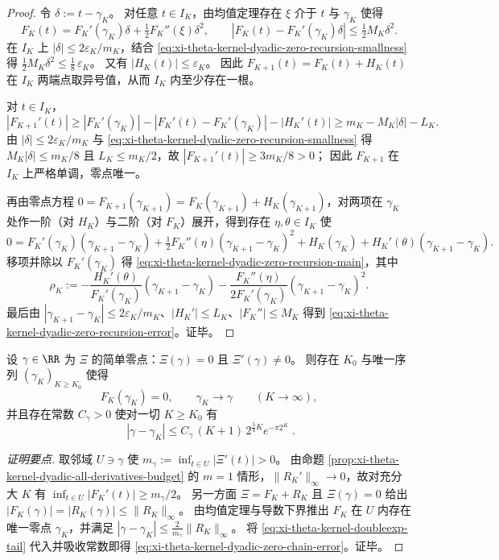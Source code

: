 \begin{proof}
令 \(\delta:=t-\gamma_K\)。
对任意 \(t\in I_K\)，由均值定理存在 \(\xi\) 介于 \(t\) 与 \(\gamma_K\) 使得
\[
F_K(t)=F_K'(\gamma_K)\delta+\tfrac12 F_K''(\xi)\delta^2,
\qquad
|F_K(t)-F_K'(\gamma_K)\delta|\le \tfrac12 M_K\delta^2.
\]
在 \(I_K\) 上 \(|\delta|\le 2\varepsilon_K/m_K\)，结合 \eqref{eq:xi-theta-kernel-dyadic-zero-recursion-smallness} 得
\(
\tfrac12 M_K\delta^2\le \tfrac18\,\varepsilon_K
\)。
又有 \(|H_K(t)|\le \varepsilon_K\)。
因此 \(F_{K+1}(t)=F_K(t)+H_K(t)\) 在 \(I_K\) 两端点取异号值，从而 \(I_K\) 内至少存在一根。
\par
对 \(t\in I_K\)，
\[
|F_{K+1}'(t)|
\ge |F_K'(\gamma_K)|-|F_K'(t)-F_K'(\gamma_K)|-|H_K'(t)|
\ge m_K-M_K|\delta|-L_K.
\]
由 \(|\delta|\le 2\varepsilon_K/m_K\) 与 \eqref{eq:xi-theta-kernel-dyadic-zero-recursion-smallness} 得
\(
M_K|\delta|\le m_K/8
\)
且 \(L_K\le m_K/2\)，故 \( |F_{K+1}'(t)|\ge 3m_K/8>0 \)；
因此 \(F_{K+1}\) 在 \(I_K\) 上严格单调，零点唯一。
\par
再由零点方程 \(0=F_{K+1}(\gamma_{K+1})=F_K(\gamma_{K+1})+H_K(\gamma_{K+1})\)，对两项在 \(\gamma_K\) 处作一阶（对 \(H_K\)）与二阶（对 \(F_K\)）展开，得到存在 \(\eta,\theta\in I_K\) 使
\[
0=F_K'(\gamma_K)(\gamma_{K+1}-\gamma_K)+\tfrac12 F_K''(\eta)(\gamma_{K+1}-\gamma_K)^2
  +H_K(\gamma_K)+H_K'(\theta)(\gamma_{K+1}-\gamma_K).
\]
移项并除以 \(F_K'(\gamma_K)\) 得 \eqref{eq:xi-theta-kernel-dyadic-zero-recursion-main}，其中
\[
\rho_K:=
-\frac{H_K'(\theta)}{F_K'(\gamma_K)}(\gamma_{K+1}-\gamma_K)
-\frac{F_K''(\eta)}{2F_K'(\gamma_K)}(\gamma_{K+1}-\gamma_K)^2.
\]
最后由 \(|\gamma_{K+1}-\gamma_K|\le 2\varepsilon_K/m_K\)、\(|H_K'|\le L_K\)、\(|F_K''|\le M_K\) 得到 \eqref{eq:xi-theta-kernel-dyadic-zero-recursion-error}。证毕。
\end{proof}

\begin{corollary}[简单零点的双指数收敛零点链]\label{cor:xi-theta-kernel-dyadic-zero-chain}
设 \(\gamma\in\RR\) 为 \(\Xi\) 的简单零点：\(\Xi(\gamma)=0\) 且 \(\Xi'(\gamma)\neq 0\)。
则存在 \(K_0\) 与唯一序列 \((\gamma_K)_{K\ge K_0}\) 使得
\[
F_K(\gamma_K)=0,\qquad \gamma_K\to\gamma\qquad(K\to\infty),
\]
并且存在常数 \(C_\gamma>0\) 使对一切 \(K\ge K_0\) 有
\begin{equation}\label{eq:xi-theta-kernel-dyadic-zero-chain-error}
\boxed{\;
|\gamma-\gamma_K|
\le C_\gamma\,(K+1)\,2^{\frac54 K}e^{-\pi 2^{K}}\; }.
\end{equation}
\end{corollary}
\begin{proof}[证明要点]
取邻域 \(U\ni \gamma\) 使 \(m_\gamma:=\inf_{t\in U}|\Xi'(t)|>0\)。
由命题 \ref{prop:xi-theta-kernel-dyadic-all-derivatives-budget} 的 \(m=1\) 情形，\(\|R_K'\|_\infty\to 0\)，故对充分大 \(K\) 有 \(\inf_{t\in U}|F_K'(t)|\ge m_\gamma/2\)。
另一方面 \(\Xi=F_K+R_K\) 且 \(\Xi(\gamma)=0\) 给出 \(|F_K(\gamma)|=|R_K(\gamma)|\le \|R_K\|_\infty\)。
由均值定理与导数下界推出 \(F_K\) 在 \(U\) 内存在唯一零点 \(\gamma_K\)，并满足
\(
|\gamma-\gamma_K|\le \frac{2}{m_\gamma}\|R_K\|_\infty
\)。
将 \eqref{eq:xi-theta-kernel-doubleexp-tail} 代入并吸收常数即得 \eqref{eq:xi-theta-kernel-dyadic-zero-chain-error}。证毕。
\end{proof}

